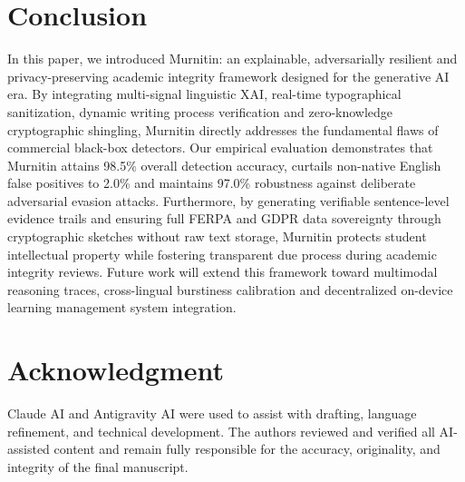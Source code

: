 \documentclass[conference]{IEEEtran}
\begin{document}
\section{Conclusion}
In this paper, we introduced Murnitin: an explainable, adversarially resilient and privacy-preserving academic integrity framework designed for the generative AI era. By integrating multi-signal linguistic XAI, real-time typographical sanitization, dynamic writing process verification and zero-knowledge cryptographic shingling, Murnitin directly addresses the fundamental flaws of commercial black-box detectors. Our empirical evaluation demonstrates that Murnitin attains 98.5\% overall detection accuracy, curtails non-native English false positives to 2.0\% and maintains 97.0\% robustness against deliberate adversarial evasion attacks. Furthermore, by generating verifiable sentence-level evidence trails and ensuring full FERPA and GDPR data sovereignty through cryptographic sketches without raw text storage, Murnitin protects student intellectual property while fostering transparent due process during academic integrity reviews. Future work will extend this framework toward multimodal reasoning traces, cross-lingual burstiness calibration and decentralized on-device learning management system integration.

\section*{Acknowledgment}
Claude AI and Antigravity AI were used to assist with drafting, language refinement, and technical development. The authors reviewed and verified all AI-assisted content and remain fully responsible for the accuracy, originality, and integrity of the final manuscript.



\end{document}
